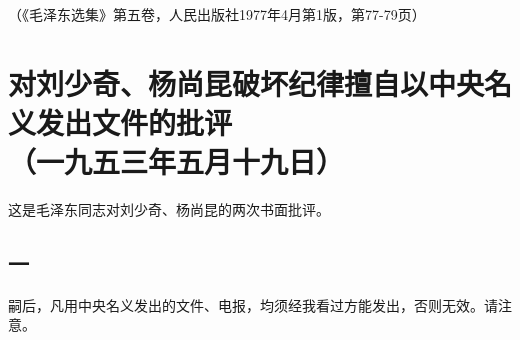 \documentclass[cn,11pt,chinese]{elegantbook}
\def\myformat#1{\hfil\hfil #1}
\begin{document}
\begin{flushright}（《毛泽东选集》第五卷，人民出版社1977年4月第1版，第77-79页）\end{flushright}
\newpage\section*{\myformat{对刘少奇、杨尚昆破坏纪律擅自以中央名义发出文件的批评}\\\myformat{（一九五三年五月十九日）}}
\begin{introduction}\item  这是毛泽东同志对刘少奇、杨尚昆的两次书面批评。\end{introduction}
\subsection*{\myformat{一}}
嗣后，凡用中央名义发出的文件、电报，均须经我看过方能发出，否则无效。请注意。\\
\end{document}
